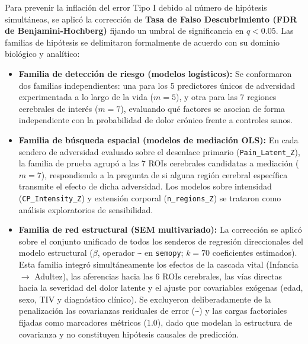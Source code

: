 \documentclass[11pt,a4paper]{article}
\begin{document}
Para prevenir la inflación del error Tipo I debido al número de hipótesis simultáneas, se aplicó la corrección de \textbf{Tasa de Falso Descubrimiento (FDR de Benjamini-Hochberg)} fijando un umbral de 
significancia en $q < 0.05$. Las familias de hipótesis se delimitaron formalmente de acuerdo con su dominio biológico y analítico:
\begin{itemize}
  \item \textbf{Familia de detección de riesgo (modelos logísticos):} Se conformaron dos familias independientes: una para los 5 predictores únicos de adversidad experimentada a lo largo de la vida ($m = 5$), 
  y otra para las 7 regiones cerebrales de interés ($m = 7$), evaluando qué factores se asocian de forma independiente con la probabilidad de dolor crónico frente a controles sanos. 
  \item \textbf{Familia de búsqueda espacial (modelos de mediación OLS):} En cada sendero de adversidad evaluado sobre el desenlace primario (\texttt{Pain\_Latent\_Z}), la familia de prueba agrupó a las 7 ROIs
  cerebrales candidatas a mediación ($m = 7$), respondiendo a la pregunta de si alguna región cerebral específica transmite el efecto de dicha adversidad. Los modelos sobre intensidad (\texttt{CP\_Intensity\_Z})
  y extensión corporal (\texttt{n\_regions\_Z}) se trataron como análisis exploratorios de sensibilidad.
  \item \textbf{Familia de red estructural (SEM multivariado):} La corrección se aplicó sobre el conjunto unificado de todos los senderos de regresión direccionales del modelo estructural ($\beta$, operador \texttt{\textasciitilde{}}
  en \texttt{semopy}; $k = 70$ coeficientes estimados). Esta familia integró simultáneamente los efectos de la cascada vital (Infancia $\to$ Adultez), las aferencias hacia las 6 ROIs cerebrales, las vías directas hacia la severidad del 
  dolor latente y el ajuste por covariables exógenas (edad, sexo, TIV y diagnóstico clínico). Se excluyeron deliberadamente de la penalización las covarianzas residuales de error (\texttt{\textasciitilde{}}) y las cargas 
  factoriales fijadas como marcadores métricos ($1.0$), dado que modelan la estructura de covarianza y no constituyen hipótesis causales de predicción.
\end{itemize}
\end{document}
